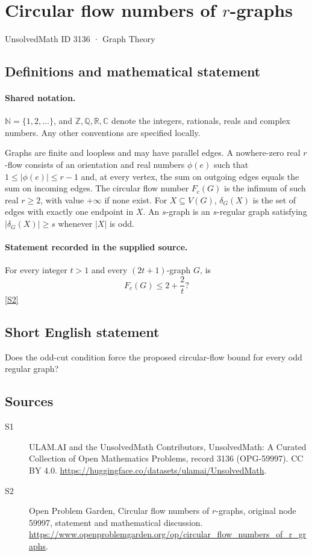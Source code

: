 \documentclass[11pt]{article}
\newcommand{\sref}[2]{\hyperlink{source:#1:#2}{[S#2]}}
\begin{document}
\setcounter{section}{3135}
\section{Circular flow numbers of $r$-graphs}\label{3136}
{\small\sffamily UnsolvedMath ID 3136 · Graph Theory}
\subsection{Definitions and mathematical statement}

\paragraph{Shared notation.}$\mathbb N=\{1,2,\ldots\}$, and $\mathbb Z,\mathbb Q,\mathbb R,\mathbb C$ denote the integers, rationals, reals and complex numbers. Any other conventions are specified locally.


Graphs are finite and loopless and may have parallel edges. A nowhere-zero real $r$-flow consists of an orientation and real numbers $\phi(e)$ such that $1\le|\phi(e)|\le r-1$ and, at every vertex, the sum on outgoing edges equals the sum on incoming edges. The circular flow number $F_c(G)$ is the infimum of such real $r\ge2$, with value $+\infty$ if none exist. For $X\subseteq V(G)$, $\delta_G(X)$ is the set of edges with exactly one endpoint in $X$. An $s$-graph is an $s$-regular graph satisfying $|\delta_G(X)|\ge s$ whenever $|X|$ is odd.
\paragraph{Statement recorded in the supplied source.}
For every integer $t>1$ and every $(2t+1)$-graph $G$, is \[F_c(G)\le2+\frac2t?\] \sref{3136}{2}
\subsection{Short English statement}
Does the odd-cut condition force the proposed circular-flow bound for every odd regular graph?
\subsection{Sources}
\begin{description}
\item[\hypertarget{source:3136:1}{S1}] ULAM.AI and the UnsolvedMath Contributors, UnsolvedMath: A Curated Collection of Open Mathematics Problems, record 3136 (OPG-59997). CC BY 4.0. \url{https://huggingface.co/datasets/ulamai/UnsolvedMath}.
\item[\hypertarget{source:3136:2}{S2}] Open Problem Garden, Circular flow numbers of $r$-graphs, original node 59997, statement and mathematical discussion. \url{https://www.openproblemgarden.org/op/circular_flow_numbers_of_r_graphs}.
\end{description}
\label{end:3136}
\end{document}
